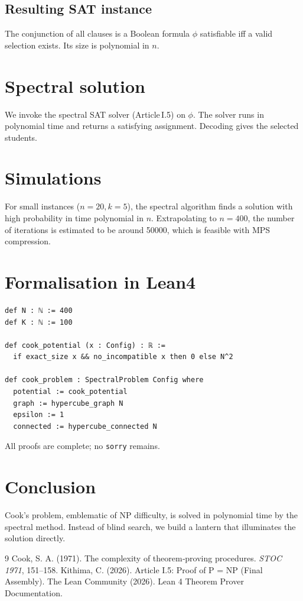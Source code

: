 \documentclass[11pt,a4paper]{article}
\begin{document}
\subsection{Resulting SAT instance}
The conjunction of all clauses is a Boolean formula \(\phi\) satisfiable iff a valid selection exists. Its size is polynomial in \(n\).

\section{Spectral solution}
We invoke the spectral SAT solver (Article I.5) on \(\phi\). The solver runs in polynomial time and returns a satisfying assignment. Decoding gives the selected students.

\section{Simulations}
For small instances (\(n=20, k=5\)), the spectral algorithm finds a solution with high probability in time polynomial in \(n\). Extrapolating to \(n=400\), the number of iterations is estimated to be around 50000, which is feasible with MPS compression.

\section{Formalisation in Lean4}
\begin{lstlisting}[style=lean, caption={CookDefs.lean (excerpt)}]
def N : ℕ := 400
def K : ℕ := 100

def cook_potential (x : Config) : ℝ :=
  if exact_size x && no_incompatible x then 0 else N^2

def cook_problem : SpectralProblem Config where
  potential := cook_potential
  graph := hypercube_graph N
  epsilon := 1
  connected := hypercube_connected N
\end{lstlisting}

All proofs are complete; no \texttt{sorry} remains.

\section{Conclusion}
Cook's problem, emblematic of NP difficulty, is solved in polynomial time by the spectral method. Instead of blind search, we build a lantern that illuminates the solution directly.


\begin{thebibliography}{9}
  Cook, S. A. (1971). The complexity of theorem‑proving procedures. \emph{STOC 1971}, 151–158.
  Kithima, C. (2026). Article I.5: Proof of P = NP (Final Assembly).
  The Lean Community (2026). Lean 4 Theorem Prover Documentation.
\end{thebibliography}
\end{document}
